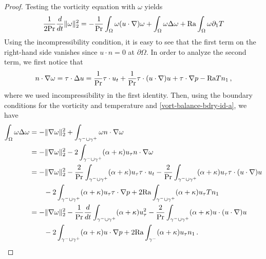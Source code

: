 \documentclass{article}
\theoremstyle{definition}
\theoremstyle{definition}
\newcommand{\Pra}{\rm{Pr}}
\newcommand{\Ra}{{\rm{Ra}}}
\begin{document}
\begin{proof}
Testing the vorticity equation with $\omega$ yields
\begin{equation}
    \label{vort-id}
    \frac{1}{2\Pra}\frac{d}{dt}\|\omega\|_2^2 = -\frac{1}{\Pra}\int_{\Omega} \omega (u\cdot \nabla)\omega + \int_{\Omega} \omega\Delta\omega +\Ra\int_{\Omega} \omega \partial_1 T
\end{equation}
Using the incompressibility condition, it is easy to see that the first term on the right-hand side vanishes since $u\cdot n=0$ at $\partial\Omega$.
In order to analyze the second term, we first notice that 
\begin{equation}
    \label{vort-balance-bdry-id-a}
    n\cdot\nabla\omega=\tau \cdot \Delta u=\frac{1}{\Pra}\tau \cdot u_t + \frac{1}{\Pra}\tau \cdot (u\cdot \nabla)u +\tau\cdot \nabla p -\Ra T n_1\,,
\end{equation}
where we used incompressibility in the first identity. Then, using the boundary conditions for the vorticity and temperature and \eqref{vort-balance-bdry-id-a}, we have 
\begin{align*}
    \int_{\Omega}\omega\Delta\omega 
    &= -\|\nabla \omega\|_2^2 +\int_{\gamma^-\cup\gamma^+} \omega n\cdot\nabla \omega\\
    &= -\|\nabla \omega\|_2^2 -2 \int_{\gamma^-\cup\gamma^+} (\alpha+\kappa)u_\tau n\cdot\nabla \omega\\
    &=-\|\nabla \omega\|_2^2 -\frac{2}{\Pra}\int_{\gamma^-\cup\gamma^+} (\alpha+\kappa)u_\tau \tau \cdot u_t - \frac{2}{\Pra}\int_{\gamma^-\cup\gamma^+} (\alpha+\kappa)u_\tau \tau \cdot (u\cdot \nabla)u \\
    &\qquad -2 \int_{\gamma^-\cup\gamma^+} (\alpha+\kappa)u_\tau \tau \cdot \nabla p + 2 \Ra \int_{\gamma^-\cup\gamma^+} (\alpha+\kappa)u_\tau T n_1\\
    &= -\|\nabla \omega\|_2^2 -\frac{1}{\Pra}\frac{d}{dt}\int_{\gamma^-\cup\gamma^+} (\alpha+\kappa)u_\tau^2 - \frac{2}{\Pra}\int_{\gamma^-\cup\gamma^+} (\alpha+\kappa) u \cdot (u\cdot \nabla)u \\
    &\qquad -2 \int_{\gamma^-\cup\gamma^+} (\alpha+\kappa) u \cdot \nabla p + 2 \Ra \int_{\gamma^-} (\alpha+\kappa)u_\tau  n_1\,.

\end{align*}
\end{proof}
\end{document}
